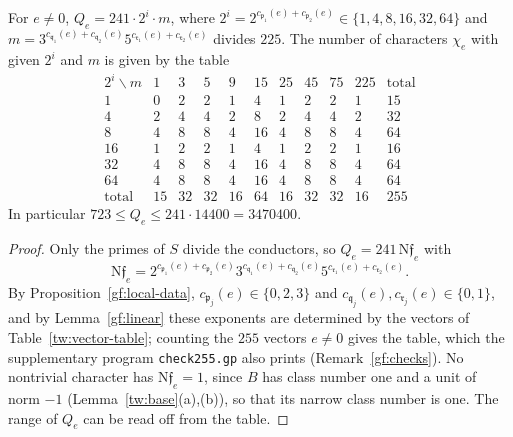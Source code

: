 \begin{corollary}\label{gf:conductors}
For $e\ne0$, $Q_e=241\cdot2^i\cdot m$, where
$2^i=2^{c_{\mathfrak p_1}(e)+c_{\mathfrak p_2}(e)}\in\{1,4,8,16,32,64\}$ and
$m=3^{c_{\mathfrak q_1}(e)+c_{\mathfrak q_2}(e)}5^{c_{\mathfrak r_1}(e)+c_{\mathfrak r_2}(e)}$
divides $225$. The number of characters $\chi_e$ with given $2^i$ and $m$ is
given by the table
\begin{equation}\label{gf:conductor-table}
\begin{array}{c|ccccccccc|c}
 2^i\backslash m&1&3&5&9&15&25&45&75&225&\text{total}\\\hline
 1&0&2&2&1&4&1&2&2&1&15\\
 4&2&4&4&2&8&2&4&4&2&32\\
 8&4&8&8&4&16&4&8&8&4&64\\
 16&1&2&2&1&4&1&2&2&1&16\\
 32&4&8&8&4&16&4&8&8&4&64\\
 64&4&8&8&4&16&4&8&8&4&64\\\hline
 \text{total}&15&32&32&16&64&16&32&32&16&255
\end{array}
\end{equation}
In particular $723\le Q_e\le241\cdot14400=3470400$.
\end{corollary}

\begin{proof}
Only the primes of $S$ divide the conductors, so $Q_e=241\,\mathrm N\mathfrak f_e$
with
\[
 \mathrm N\mathfrak f_e=2^{c_{\mathfrak p_1}(e)+c_{\mathfrak
 p_2}(e)}3^{c_{\mathfrak q_1}(e)+c_{\mathfrak q_2}(e)}5^{c_{\mathfrak
 r_1}(e)+c_{\mathfrak r_2}(e)}.
\]
By Proposition~\ref{gf:local-data},
$c_{\mathfrak p_j}(e)\in\{0,2,3\}$ and
$c_{\mathfrak q_j}(e),c_{\mathfrak r_j}(e)\in\{0,1\}$, and by
Lemma~\ref{gf:linear} these exponents are determined by the vectors of
Table~\ref{tw:vector-table}; counting the $255$ vectors $e\ne0$ gives the
table, which the supplementary program \texttt{check255.gp} also prints
(Remark~\ref{gf:checks}). No nontrivial character has $\mathrm N\mathfrak f_e=1$,
since $B$ has class number one and a unit of norm $-1$
(Lemma~\ref{tw:base}(a),(b)), so that its narrow class number is one. The
range of $Q_e$ can be read off from the table.
\end{proof}

